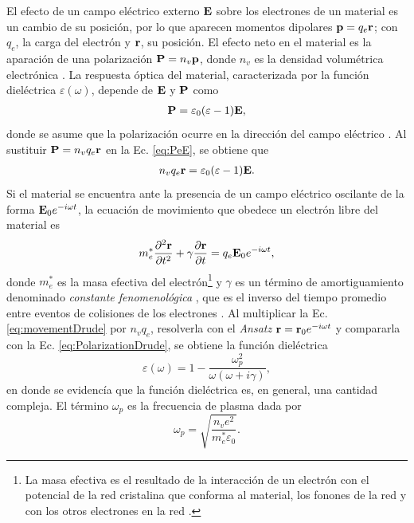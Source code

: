 \documentclass[letterpaper,11pt] {article}
\begin{document}
El efecto de un campo eléctrico externo $\vb{E}$ sobre los electrones de un material es un cambio de su posición, por lo que aparecen momentos dipolares $\vb{p}=q_e\vb{r}$; con $q_e$, la carga del electrón y $\vb{r}$, su posición.  El efecto neto en el material es la aparación de una polarización $\vb{P} = n_v \vb{p}$, donde $n_v$ es la densidad volumétrica electrónica \cite{novotny2006principles}.  La respuesta óptica del material, caracterizada por la función dieléctrica $\varepsilon(\omega)$, depende de $\vb{E}$ y $\vb{P}$ como \cite{novotny2006principles}
	\begin{align}
	\vb{P} = \varepsilon_0(\varepsilon-1)\vb{E},
	\label{eq:PeE}
	\end{align}
donde se asume que la polarización ocurre en la dirección del campo eléctrico \cite{novotny2006principles}.  Al sustituir $\vb{P} = n_v q_e \vb{r}$ en la Ec.  \eqref{eq:PeE}, se obtiene que
	\begin{align}
	n_v q_e \vb{r} = \varepsilon_0 (\varepsilon-1)\vb{E}. 
	\label{eq:PolarizationDrude}
	\end{align}
Si el material se encuentra ante la presencia de un campo eléctrico oscilante de la forma $\vb{E}_0 e^{-i\omega t}$, la ecuación de movimiento que obedece un electrón libre del material es \cite{kreibig1995clusters,gross2014festkorperphysik}
	\begin{equation}
	m_e^* \pdv[2]{\vb{r}}{t} +  \gamma \pdv{\vb{r}}{t} = q_e\vb{E}_0e^{-i\omega t},
	\label{eq:movementDrude}
	\end{equation}
donde $m_e^*$ es la masa efectiva del electrón\footnote{La masa efectiva es el resultado de la interacción de un electrón con el potencial de la red cristalina que conforma al material, los fonones de la red y con los otros electrones en la red \cite{gross2014festkorperphysik}. } \cite{gross2014festkorperphysik} y $\gamma$ es un término de amortiguamiento denominado \emph{constante fenomenológica} \cite{kreibig1995clusters}, que es el inverso del tiempo promedio entre eventos de colisiones  de los electrones \cite{novotny2006principles,gross2014festkorperphysik}.  Al multiplicar la Ec.  \eqref{eq:movementDrude} por $n_v q_e$, resolverla con el \emph{Ansatz} $\vb{r} = \vb{r}_0e^{-i\omega t}$ y compararla con la Ec.  \eqref{eq:PolarizationDrude}, se obtiene la función dieléctrica
	\begin{equation}
	\varepsilon(\omega) = 1 - \frac{\omega_p^2}{\omega(\omega+i\gamma)},
	\label{eq:Drude}
	\end{equation}
en donde se evidencía que la función dieléctrica es, en general, una cantidad compleja.  El  término $\omega_p$ es la frecuencia de plasma dada por \cite{novotny2006principles,gross2014festkorperphysik} 
	\begin{equation*}
	\omega_p =\sqrt{ \frac{n_v e^2}{m_e^* \varepsilon_0}}. 
	\end{equation*}
	
\end{document}
